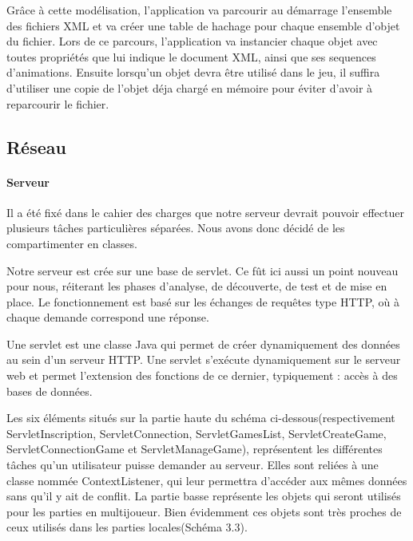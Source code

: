 			Grâce à cette modélisation, l'application va parcourir au démarrage l'ensemble des fichiers 
			XML et va créer une table de hachage pour chaque ensemble d'objet du fichier.
			Lors de ce parcours, l'application va instancier chaque objet avec toutes propriétés 
			que lui indique le document XML, ainsi que ses sequences d'animations.
			Ensuite lorsqu'un objet devra être utilisé dans le jeu, il suffira d'utiliser 
			une copie de l'objet déja chargé en mémoire pour éviter d'avoir à reparcourir le fichier.


\subsection{Réseau}
		
	\paragraph{Serveur\\}
			
		Il a été fixé dans le cahier des charges que notre serveur devrait pouvoir
		effectuer plusieurs tâches particulières séparées. Nous avons donc décidé de
		les compartimenter en classes.
		
		Notre serveur est crée sur une base de servlet. Ce fût ici
		aussi un point nouveau pour nous, réiterant les phases d'analyse, de
		découverte, de test et de mise en place. Le fonctionnement est basé sur les
		échanges de requêtes type HTTP, où à chaque demande correspond une réponse. 
		
		Une servlet est une classe Java qui permet de créer dynamiquement des données
		au sein d'un serveur HTTP. Une servlet s'exécute dynamiquement sur le serveur
		web et permet l'extension des fonctions de ce dernier, typiquement : accès à
		des bases de données.
			
		Les six éléments situés sur la partie haute du schéma
		ci-dessous(respectivement ServletInscription, ServletConnection,
		ServletGamesList, ServletCreateGame, ServletConnectionGame et
		ServletManageGame), représentent les différentes tâches qu'un utilisateur
		puisse demander au serveur. Elles sont reliées à une classe nommée
		ContextListener, qui leur permettra d'accéder aux mêmes données sans qu'il y
		ait de conflit. La partie basse représente les objets qui seront utilisés 
		pour les parties en multijoueur. 
		Bien évidemment ces objets sont très proches de ceux utilisés dans les parties
		locales(Schéma 3.3).
		
